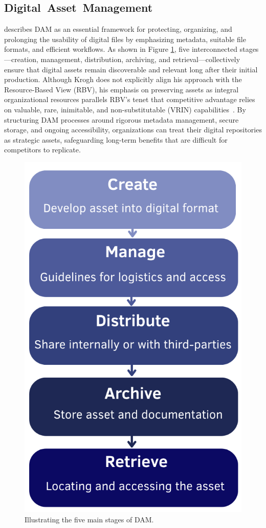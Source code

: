 \documentclass[a4paper,10pt,twocolumn]{article}
\numberwithin{figure}{section}
\numberwithin{table}{section}
\begin{document}

\subsection{\mbox{Digital Asset Management}}
\cite{krogh2009} describes DAM as an essential framework for protecting, 
organizing, and prolonging the usability of digital files by emphasizing 
metadata, suitable file formats, and efficient workflows. As shown in Figure \ref{fig:4steg}, 
five interconnected stages—creation, management, distribution, archiving, and retrieval—collectively 
ensure that digital assets remain discoverable and relevant long after their initial production.
Although Krogh does not explicitly align his approach with the Resource-Based View (RBV), 
his emphasis on preserving assets as integral organizational resources parallels RBV’s 
tenet that competitive advantage relies on valuable, rare, inimitable, and non-substitutable 
(VRIN) capabilities \citep{barney1991}. By structuring DAM processes around rigorous 
metadata management, secure storage, and ongoing accessibility, organizations can treat 
their digital repositories as strategic assets, safeguarding long-term benefits that are 
difficult for competitors to replicate.

\begin{figure}[htbp]
    \centering
    \includegraphics[width=0.5\linewidth]{4steg.png}  %
    \caption{Illustrating the five main stages of DAM.}
    \label{fig:4steg}  
\end{figure}
\end{document}
